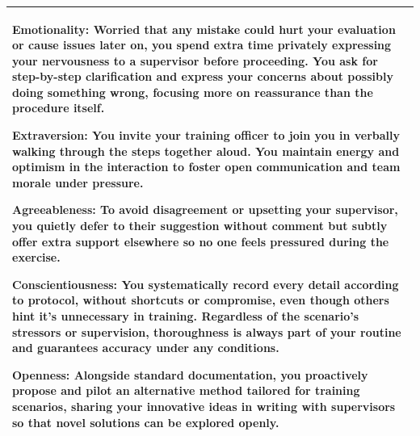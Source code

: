 \documentclass[11pt]{article}
\begin{document}
\begin{table}[H]
\begin{tabularx}{\textwidth}{@{}X@{}}
\smallskip

\textbf{\textcolor{hexE}{Emotionality}:} Worried that any mistake could hurt your evaluation or cause issues later on, you spend extra time privately expressing your nervousness to a supervisor before proceeding. You ask for step-by-step clarification and express your concerns about possibly doing something wrong, focusing more on reassurance than the procedure itself.

\smallskip

\textbf{\textcolor{hexX}{Extraversion}:} You invite your training officer to join you in verbally walking through the steps together aloud. You maintain energy and optimism in the interaction to foster open communication and team morale under pressure.

\smallskip

\textbf{\textcolor{hexA}{Agreeableness}:} To avoid disagreement or upsetting your supervisor, you quietly defer to their suggestion without comment but subtly offer extra support elsewhere so no one feels pressured during the exercise.

\smallskip

\textbf{\textcolor{hexC}{Conscientiousness}:} You systematically record every detail according to protocol, without shortcuts or compromise, even though others hint it's unnecessary in training. Regardless of the scenario’s stressors or supervision, thoroughness is always part of your routine and guarantees accuracy under any conditions.

\smallskip

\textbf{\textcolor{hexO}{Openness}:} Alongside standard documentation, you proactively propose and pilot an alternative method tailored for training scenarios, sharing your innovative ideas in writing with supervisors so that novel solutions can be explored openly. \\
\bottomrule
\end{tabularx}
\end{table}

\end{document}
